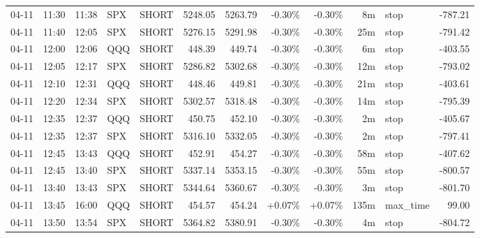 \documentclass[11pt,a4paper]{article}
\begin{document}
\begin{center}
\begin{longtable}{>{\color{txtmain}}l l l l l r r r r r >{\color{txtmain}}l r}
04-11 & 11:30 & 11:38 & SPX & SHORT & 5248.05 & 5263.79 & \textcolor{lossred}{-0.30\%} & \textcolor{lossred}{-0.30\%} & 8m & stop & \textcolor{lossred}{-787.21} \\
04-11 & 11:40 & 12:05 & SPX & SHORT & 5276.15 & 5291.98 & \textcolor{lossred}{-0.30\%} & \textcolor{lossred}{-0.30\%} & 25m & stop & \textcolor{lossred}{-791.42} \\
04-11 & 12:00 & 12:06 & QQQ & SHORT & 448.39 & 449.74 & \textcolor{lossred}{-0.30\%} & \textcolor{lossred}{-0.30\%} & 6m & stop & \textcolor{lossred}{-403.55} \\
04-11 & 12:05 & 12:17 & SPX & SHORT & 5286.82 & 5302.68 & \textcolor{lossred}{-0.30\%} & \textcolor{lossred}{-0.30\%} & 12m & stop & \textcolor{lossred}{-793.02} \\
04-11 & 12:10 & 12:31 & QQQ & SHORT & 448.46 & 449.81 & \textcolor{lossred}{-0.30\%} & \textcolor{lossred}{-0.30\%} & 21m & stop & \textcolor{lossred}{-403.61} \\
04-11 & 12:20 & 12:34 & SPX & SHORT & 5302.57 & 5318.48 & \textcolor{lossred}{-0.30\%} & \textcolor{lossred}{-0.30\%} & 14m & stop & \textcolor{lossred}{-795.39} \\
04-11 & 12:35 & 12:37 & QQQ & SHORT & 450.75 & 452.10 & \textcolor{lossred}{-0.30\%} & \textcolor{lossred}{-0.30\%} & 2m & stop & \textcolor{lossred}{-405.67} \\
04-11 & 12:35 & 12:37 & SPX & SHORT & 5316.10 & 5332.05 & \textcolor{lossred}{-0.30\%} & \textcolor{lossred}{-0.30\%} & 2m & stop & \textcolor{lossred}{-797.41} \\
04-11 & 12:45 & 13:43 & QQQ & SHORT & 452.91 & 454.27 & \textcolor{lossred}{-0.30\%} & \textcolor{lossred}{-0.30\%} & 58m & stop & \textcolor{lossred}{-407.62} \\
04-11 & 12:45 & 13:40 & SPX & SHORT & 5337.14 & 5353.15 & \textcolor{lossred}{-0.30\%} & \textcolor{lossred}{-0.30\%} & 55m & stop & \textcolor{lossred}{-800.57} \\
04-11 & 13:40 & 13:43 & SPX & SHORT & 5344.64 & 5360.67 & \textcolor{lossred}{-0.30\%} & \textcolor{lossred}{-0.30\%} & 3m & stop & \textcolor{lossred}{-801.70} \\
04-11 & 13:45 & 16:00 & QQQ & SHORT & 454.57 & 454.24 & \textcolor{wingreen}{+0.07\%} & \textcolor{wingreen}{+0.07\%} & 135m & max\_time & \textcolor{wingreen}{99.00} \\
04-11 & 13:50 & 13:54 & SPX & SHORT & 5364.82 & 5380.91 & \textcolor{lossred}{-0.30\%} & \textcolor{lossred}{-0.30\%} & 4m & stop & \textcolor{lossred}{-804.72} \\

\end{longtable}
\end{center}
\end{document}
